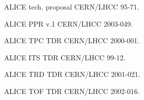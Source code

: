 \documentclass{elsart}
\begin{document}
\begin{thebibliography}{9}   %

ALICE tech. proposal CERN/LHCC 95-71.

ALICE PPR v.1 CERN/LHCC 2003-049.

ALICE TPC TDR CERN/LHCC 2000-001.

ALICE ITS TDR CERN/LHCC 99-12.

ALICE TRD TDR CERN/LHCC 2001-021.

ALICE TOF TDR CERN/LHCC 2002-016.


\end{thebibliography}
\end{document}
